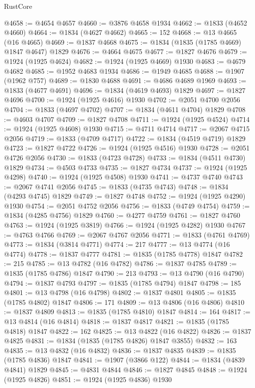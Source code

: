 \begin{lexlean}{RustCore}
\begin{coremodule}
@4658 := @4654 @4657
@4660 := @3876 @4658 @1934
@4662 := @1833 (@4652 @4660)
@4664 := @1834 (@4627 @4662)
@4665 := 152
@4668 := @13 @4665 (@16 @4665)
@4669 := @1837 @4668
@4675 := @1834 (@1835 (@1785 @4669) @1847 @4647) @1829
@4676 := @4664 @4675
@4677 := @1827 @4676
@4679 := @1924 (@1925 @4624)
@4682 := @1924 (@1925 @4669) @1930
@4683 := @4679 @4682
@4685 := @1952 @4683 @1934
@4686 := @1949 @4685
@4688 := @1907 (@1962 @757)
@4689 := @1830 @4688
@4691 := @4686 @4689 @1969
@4693 := @1833 (@4677 @4691)
@4696 := @1834 (@4619 @4693) @1829
@4697 := @1827 @4696
@4700 := @1924 (@1925 @4616) @1930
@4702 := @2051 @4700 @2056
@4704 := @1833 (@4697 @4702)
@4707 := @1834 (@4611 @4704) @1829
@4708 := @4603 @4707
@4709 := @1827 @4708
@4711 := @1924 (@1925 @4524)
@4714 := @1924 (@1925 @4608) @1930
@4715 := @4711 @4714
@4717 := @2067 @4715 @2056
@4719 := @1833 (@4709 @4717)
@4722 := @1834 (@4519 @4719) @1829
@4723 := @1827 @4722
@4726 := @1924 (@1925 @4516) @1930
@4728 := @2051 @4726 @2056
@4730 := @1833 (@4723 @4728)
@4733 := @1834 (@4511 @4730) @1829
@4734 := @4503 @4733
@4735 := @1827 @4734
@4737 := @1924 (@1925 @4298)
@4740 := @1924 (@1925 @4508) @1930
@4741 := @4737 @4740
@4743 := @2067 @4741 @2056
@4745 := @1833 (@4735 @4743)
@4748 := @1834 (@4293 @4745) @1829
@4749 := @1827 @4748
@4752 := @1924 (@1925 @4290) @1930
@4754 := @2051 @4752 @2056
@4756 := @1833 (@4749 @4754)
@4759 := @1834 (@4285 @4756) @1829
@4760 := @4277 @4759
@4761 := @1827 @4760
@4763 := @1924 (@1925 @3819)
@4766 := @1924 (@1925 @4282) @1930
@4767 := @4763 @4766
@4769 := @2067 @4767 @2056
@4771 := @1833 (@4761 @4769)
@4773 := @1834 (@3814 @4771)
@4774 := 217
@4777 := @13 @4774 (@16 @4774)
@4778 := @1837 @4777
@4781 := @1835 (@1785 @4778) @1847
@4782 := 215
@4785 := @13 @4782 (@16 @4782)
@4786 := @1837 @4785
@4789 := @1835 (@1785 @4786) @1847
@4790 := 213
@4793 := @13 @4790 (@16 @4790)
@4794 := @1837 @4793
@4797 := @1835 (@1785 @4794) @1847
@4798 := 185
@4801 := @13 @4798 (@16 @4798)
@4802 := @1837 @4801
@4805 := @1835 (@1785 @4802) @1847
@4806 := 171
@4809 := @13 @4806 (@16 @4806)
@4810 := @1837 @4809
@4813 := @1835 (@1785 @4810) @1847
@4814 := 164
@4817 := @13 @4814 (@16 @4814)
@4818 := @1837 @4817
@4821 := @1835 (@1785 @4818) @1847
@4822 := 162
@4825 := @13 @4822 (@16 @4822)
@4826 := @1837 @4825
@4831 := @1834 (@1835 (@1785 @4826) @1847 @3855)
@4832 := 163
@4835 := @13 @4832 (@16 @4832)
@4836 := @1837 @4835
@4839 := @1835 (@1785 @4836) @1847
@4841 := @1907 (@3866 @122)
@4844 := @1834 (@4839 @4841) @1829
@4845 := @4831 @4844
@4846 := @1827 @4845
@4848 := @1924 (@1925 @4826)
@4851 := @1924 (@1925 @4836) @1930

\end{coremodule}
\end{lexlean}

